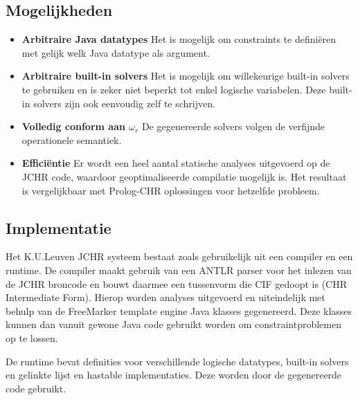 \subsection{Mogelijkheden}

\begin{itemize}
\item {\bf Arbitraire Java datatypes} Het is mogelijk om constraints te defini\"eren met gelijk welk Java datatype als argument.
\item {\bf Arbitraire built-in solvers} Het is mogelijk om willekeurige built-in solvers te gebruiken en is zeker niet beperkt tot enkel logische variabelen. Deze built-in solvers zijn ook eenvoudig zelf te schrijven.
\item {\bf Volledig conform aan $\omega_r$} De gegenereerde solvers volgen de verfijnde operationele semantiek.
\item {\bf Effici\"entie} Er wordt een heel aantal statische analyses uitgevoerd op de JCHR code, waardoor geoptimaliseerde compilatie mogelijk is. Het resultaat is vergelijkbaar met Prolog-CHR oplossingen voor hetzelfde probleem.
\end{itemize}

\subsection{Implementatie}

Het K.U.Leuven JCHR systeem bestaat zoals gebruikelijk uit een compiler en een runtime. De compiler maakt gebruik van een ANTLR parser voor het inlezen van de JCHR broncode en bouwt daarmee een tussenvorm die CIF gedoopt is (CHR Intermediate Form). Hierop worden analyses uitgevoerd en uiteindelijk met behulp van de FreeMarker template engine Java klasses gegenereerd. Deze klasses kunnen dan vanuit gewone Java code gebruikt worden om constraintproblemen op te lossen.

De runtime bevat definities voor verschillende logische datatypes, built-in solvers en gelinkte lijst en hastable implementaties. Deze worden door de gegenereerde code gebruikt.
